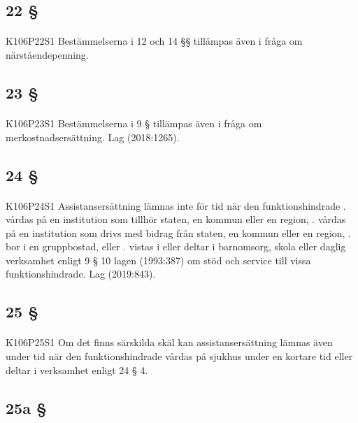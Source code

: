 \documentclass[a4paper,notitlepage,openany,10pt]{book}
\begin{document}
\subsection*{22 §}
\paragraph*{}
{\tiny K106P22S1}
Bestämmelserna i 12 och 14 §§ tillämpas även i fråga om närståendepenning.
\subsection*{23 §}
\paragraph*{}
{\tiny K106P23S1}
Bestämmelserna i 9 § tillämpas även i fråga om merkostnadsersättning.
Lag (2018:1265).
\subsection*{24 §}
\paragraph*{}
{\tiny K106P24S1}
Assistansersättning lämnas inte för tid när den funktionshindrade
. vårdas på en institution som tillhör staten, en kommun eller en region,
. vårdas på en institution som drivs med bidrag från staten, en kommun eller en region,
. bor i en gruppbostad, eller
. vistas i eller deltar i barnomsorg, skola eller daglig verksamhet enligt 9 § 10 lagen (1993:387) om stöd och service till vissa funktionshindrade.
Lag (2019:843).
\subsection*{25 §}
\paragraph*{}
{\tiny K106P25S1}
Om det finns särskilda skäl kan assistansersättning lämnas även under tid när den funktionshindrade vårdas på sjukhus under en kortare tid eller deltar i verksamhet enligt 24 § 4.
\subsection*{25a §}
\end{document}
